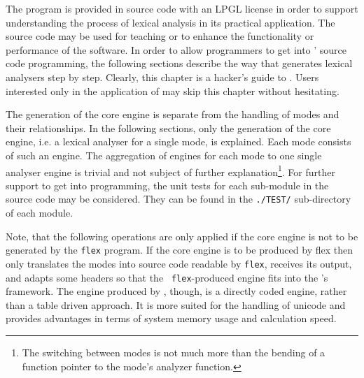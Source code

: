The {\quex} program is provided in source code with an LPGL license in order
to support understanding the process of lexical analysis in its practical
application. The source code may be used for teaching or to enhance 
the functionality or performance of the software. In order to allow
programmers to get into {\quex}' source code programming, the following sections
describe the way that {\quex} generates lexical analysers step by step. 
Clearly, this chapter is a hacker's guide to {\quex}. Users interested
only in the application of {\quex} may skip this chapter without hesitating.

The generation of the core engine is separate from the handling of modes and
their relationships. In the following sections, only the generation of the core
engine, i.e. a lexical analyser for a single mode, is explained. Each mode
consists of such an engine. The aggregation of engines for each mode to one
single analyser engine is trivial and not subject of further explanation\footnote{The
switching between modes is not much more than the bending of a function pointer to
the mode's analyzer function.}. For further support to get into programming, the
unit tests for each sub-module in the source code may be considered. They can
be found in the {\tt ./TEST/} sub-directory of each module. 

Note, that the following operations are only applied if the core engine is not
to be generated by the {\tt flex} program.  If the core engine is to be
produced by flex then {\quex} only translates the modes into source code readable
by {\tt flex}, receives its output, and adapts some headers so that the {\tt
flex}-produced engine fits into the {\quex}'s framework. The engine produced
by {\quex}, though, is a directly coded engine, rather than a table driven
approach. It is more suited for the handling of unicode and provides
advantages in terms of system memory usage and calculation speed.
